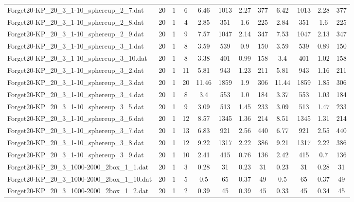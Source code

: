 \begin{sidewaystable}[!ht]
{\begin{tabular}{lccccccccccc}
Forget20-KP\_20\_3\_1-10\_sphereup\_2\_7.dat & 20 & 1 & 6 & 6.46 & 1013 &  \textcolor{blue2}{2.27} & 377 & 6.42 & 1013 & 2.28 & 377 \\
Forget20-KP\_20\_3\_1-10\_sphereup\_2\_8.dat & 20 & 1 & 4 & 2.85 & 351 & 1.6 & 225 & 2.84 & 351 & 1.6 & 225 \\
Forget20-KP\_20\_3\_1-10\_sphereup\_2\_9.dat & 20 & 1 & 9 & 7.57 & 1047 & 2.14 & 347 & 7.53 & 1047 &  \textcolor{blue2}{2.13} & 347 \\
Forget20-KP\_20\_3\_1-10\_sphereup\_3\_1.dat & 20 & 1 & 8 & 3.59 & 539 & 0.9 & 150 & 3.59 & 539 &  \textcolor{blue2}{0.89} & 150 \\
Forget20-KP\_20\_3\_1-10\_sphereup\_3\_10.dat & 20 & 1 & 8 & 3.38 & 401 & 0.99 & 158 & 3.4 & 401 & 1.02 & 158 \\
Forget20-KP\_20\_3\_1-10\_sphereup\_3\_2.dat & 20 & 1 & 11 & 5.81 & 943 & 1.23 & 211 & 5.81 & 943 &  \textcolor{blue2}{1.16} & 211 \\
Forget20-KP\_20\_3\_1-10\_sphereup\_3\_3.dat & 20 & 1 & 20 & 11.46 & 1859 & 1.9 & 306 & 11.44 & 1859 &  \textcolor{blue2}{1.85} & 306 \\
Forget20-KP\_20\_3\_1-10\_sphereup\_3\_4.dat & 20 & 1 & 8 & 3.4 & 553 &  \textcolor{blue2}{1.0} & 184 & 3.37 & 553 & 1.03 & 184 \\
Forget20-KP\_20\_3\_1-10\_sphereup\_3\_5.dat & 20 & 1 & 9 & 3.09 & 513 & 1.45 & 233 & 3.09 & 513 & 1.47 & 233 \\
Forget20-KP\_20\_3\_1-10\_sphereup\_3\_6.dat & 20 & 1 & 12 & 8.57 & 1345 & 1.36 & 214 & 8.51 & 1345 & 1.31 & 214 \\
Forget20-KP\_20\_3\_1-10\_sphereup\_3\_7.dat & 20 & 1 & 13 & 6.83 & 921 & 2.56 & 440 & 6.77 & 921 &  \textcolor{blue2}{2.55} & 440 \\
Forget20-KP\_20\_3\_1-10\_sphereup\_3\_8.dat & 20 & 1 & 12 & 9.22 & 1317 &  \textcolor{blue2}{2.22} & 386 & 9.21 & 1317 &  \textcolor{blue2}{2.22} & 386 \\
Forget20-KP\_20\_3\_1-10\_sphereup\_3\_9.dat & 20 & 1 & 10 & 2.41 & 415 & 0.76 & 136 & 2.42 & 415 &  \textcolor{blue2}{0.7} & 136 \\
Forget20-KP\_20\_3\_1000-2000\_2box\_1\_1.dat & 20 & 1 & 3 & 0.28 & 31 &  \textcolor{blue2}{0.23} & 31 &  \textcolor{blue2}{0.23} & 31 & 0.28 & 31 \\
Forget20-KP\_20\_3\_1000-2000\_2box\_1\_10.dat & 20 & 1 & 5 & 0.5 & 65 &  \textcolor{blue2}{0.37} & 49 & 0.5 & 65 &  \textcolor{blue2}{0.37} & 49 \\
Forget20-KP\_20\_3\_1000-2000\_2box\_1\_2.dat & 20 & 1 & 2 & 0.39 & 45 & 0.39 & 45 &  \textcolor{blue2}{0.33} & 45 & 0.34 & 45 \\

\end{tabular}}
\end{sidewaystable}
